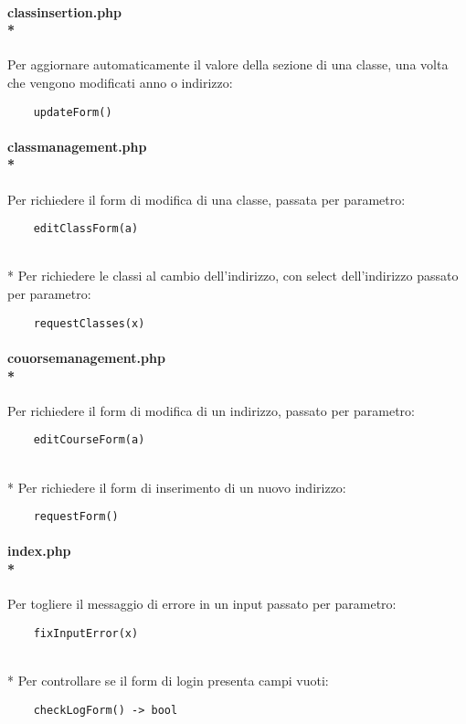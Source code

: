 \documentclass[12pt]{article}
\begin{document}
\paragraph{classinsertion.php\\*}
\noindent
Per aggiornare automaticamente il valore della sezione di una classe, una volta che vengono modificati anno o indirizzo:
\begin{verbatim}
    updateForm()
\end{verbatim}

\paragraph{classmanagement.php\\*}
\noindent
Per richiedere il form di modifica di una classe, passata per parametro:
\begin{verbatim}
    editClassForm(a)
\end{verbatim}
\\*
\noindent
Per richiedere le classi al cambio dell'indirizzo, con select dell'indirizzo passato per parametro:
\begin{verbatim}
    requestClasses(x)
\end{verbatim}

\paragraph{couorsemanagement.php\\*}
\noindent
Per richiedere il form di modifica di un indirizzo, passato per parametro:
\begin{verbatim}
    editCourseForm(a)
\end{verbatim}

\\*
\noindent
Per richiedere il form di inserimento di un nuovo indirizzo:
\begin{verbatim}
    requestForm()
\end{verbatim}

\paragraph{index.php\\*}
\noindent
Per togliere il messaggio di errore in un input passato per parametro:
\begin{verbatim}
    fixInputError(x)
\end{verbatim}

\\*
\noindent
Per controllare se il form di login presenta campi vuoti:
\begin{verbatim}
    checkLogForm() -> bool
\end{verbatim}
\end{document}
